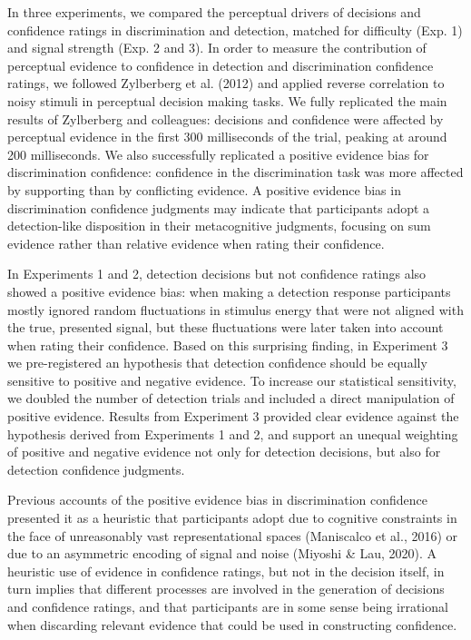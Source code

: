 \documentclass[12pt,twoside]{reedthesis}
\begin{document}
In three experiments, we compared the perceptual drivers of decisions and confidence ratings in discrimination and detection, matched for difficulty (Exp. 1) and signal strength (Exp. 2 and 3). In order to measure the contribution of perceptual evidence to confidence in detection and discrimination confidence ratings, we followed Zylberberg et al. (2012) and applied reverse correlation to noisy stimuli in perceptual decision making tasks. We fully replicated the main results of Zylberberg and colleagues: decisions and confidence were affected by perceptual evidence in the first 300 milliseconds of the trial, peaking at around 200 milliseconds. We also successfully replicated a positive evidence bias for discrimination confidence: confidence in the discrimination task was more affected by supporting than by conflicting evidence. A positive evidence bias in discrimination confidence judgments may indicate that participants adopt a detection-like disposition in their metacognitive judgments, focusing on sum evidence rather than relative evidence when rating their confidence.

In Experiments 1 and 2, detection decisions but not confidence ratings also showed a positive evidence bias: when making a detection response participants mostly ignored random fluctuations in stimulus energy that were not aligned with the true, presented signal, but these fluctuations were later taken into account when rating their confidence. Based on this surprising finding, in Experiment 3 we pre-registered an hypothesis that detection confidence should be equally sensitive to positive and negative evidence. To increase our statistical sensitivity, we doubled the number of detection trials and included a direct manipulation of positive evidence. Results from Experiment 3 provided clear evidence against the hypothesis derived from Experiments 1 and 2, and support an unequal weighting of positive and negative evidence not only for detection decisions, but also for detection confidence judgments.

Previous accounts of the positive evidence bias in discrimination confidence presented it as a heuristic that participants adopt due to cognitive constraints in the face of unreasonably vast representational spaces (Maniscalco et al., 2016) or due to an asymmetric encoding of signal and noise (Miyoshi \& Lau, 2020). A heuristic use of evidence in confidence ratings, but not in the decision itself, in turn implies that different processes are involved in the generation of decisions and confidence ratings, and that participants are in some sense being irrational when discarding relevant evidence that could be used in constructing confidence.
\end{document}
